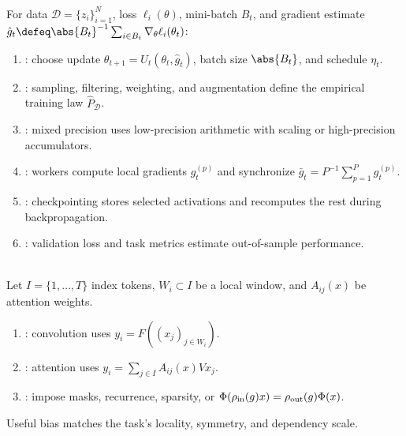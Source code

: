 \begin{remark} \label{rem:sl-large-scale-training} \\
For data $\mathcal D=\{z_i\}_{i=1}^N$, loss $\ell_i(\theta)$, mini-batch $B_t$, and gradient estimate $\hat g_t\defeq\abs{B_t}^{-1}\sum_{i\in B_t}\nabla_\theta\ell_i(\theta_t)$:
\begin{enumerate}[label=(\roman*)]
\setlength{\itemsep}{0pt}
\item {}: choose update $\theta_{t+1}=U_t(\theta_t,\hat g_t)$, batch size $\abs{B_t}$, and schedule $\eta_t$.
\item {}: sampling, filtering, weighting, and augmentation define the empirical training law $\widehat P_{\mathcal D}$.
\item {}: mixed precision uses low-precision arithmetic with scaling or high-precision accumulators.
\item {}: workers compute local gradients $g_t^{(p)}$ and synchronize $\bar g_t=P^{-1}\sum_{p=1}^Pg_t^{(p)}$.
\item {}: checkpointing stores selected activations and recomputes the rest during backpropagation.
\item {}: validation loss and task metrics estimate out-of-sample performance.
\end{enumerate}
\end{remark}

\begin{remark} \label{rem:sl-transformer-generalization} \\
Let $I=\{1,\ldots,T\}$ index tokens, $W_i\subset I$ be a local window, and $A_{ij}(x)$ be attention weights.
\begin{enumerate}[label=(\roman*)]
\setlength{\itemsep}{0pt}
\item {}: convolution uses $y_i=F((x_j)_{j\in W_i})$.
\item {}: attention uses $y_i=\sum_{j\in I}A_{ij}(x)Vx_j$.
\item {}: impose masks, recurrence, sparsity, or $\Phi(\rho_{\rm in}(g)x)=\rho_{\rm out}(g)\Phi(x)$.
\end{enumerate}
Useful bias matches the task's locality, symmetry, and dependency scale.
\end{remark}
